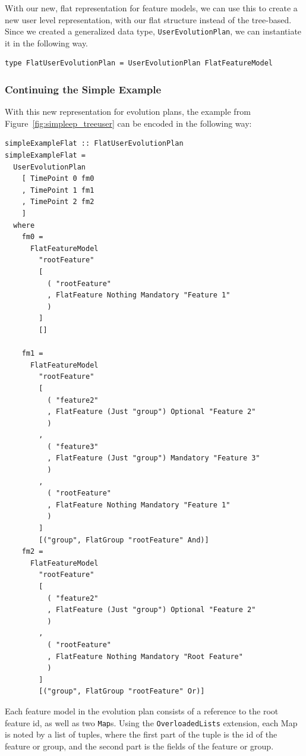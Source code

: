 \documentclass[a4paper,english]{ifimaster}
\begin{document}
With our new, flat representation for feature models, we can use this to create a new user level representation, with our flat structure instead of the tree-based. Since we created a generalized data type, \texttt{UserEvolutionPlan}, we can instantiate it in the following way.

\begin{verbatim}
type FlatUserEvolutionPlan = UserEvolutionPlan FlatFeatureModel
\end{verbatim}

\subsubsection{Continuing the Simple Example}%
\label{ssub:continuing_the_simple_example}

With this new representation for evolution plans, the example from Figure~\vref{fig:simpleep_treeuser} can be encoded in the following way:

\begin{verbatim}
simpleExampleFlat :: FlatUserEvolutionPlan
simpleExampleFlat =
  UserEvolutionPlan
    [ TimePoint 0 fm0
    , TimePoint 1 fm1
    , TimePoint 2 fm2
    ]
  where
    fm0 =
      FlatFeatureModel
        "rootFeature"
        [
          ( "rootFeature"
          , FlatFeature Nothing Mandatory "Feature 1"
          )
        ]
        []

    fm1 =
      FlatFeatureModel
        "rootFeature"
        [
          ( "feature2"
          , FlatFeature (Just "group") Optional "Feature 2"
          )
        ,
          ( "feature3"
          , FlatFeature (Just "group") Mandatory "Feature 3"
          )
        ,
          ( "rootFeature"
          , FlatFeature Nothing Mandatory "Feature 1"
          )
        ]
        [("group", FlatGroup "rootFeature" And)]
    fm2 =
      FlatFeatureModel
        "rootFeature"
        [
          ( "feature2"
          , FlatFeature (Just "group") Optional "Feature 2"
          )
        ,
          ( "rootFeature"
          , FlatFeature Nothing Mandatory "Root Feature"
          )
        ]
        [("group", FlatGroup "rootFeature" Or)]
\end{verbatim}

Each feature model in the evolution plan consists of a reference to the root feature id, as well as two \texttt{Map}s. Using the \texttt{OverloadedLists} extension, each Map is noted by a list of tuples, where the first part of the tuple is the id of the feature or group, and the second part is the fields of the feature or group.
\end{document}
